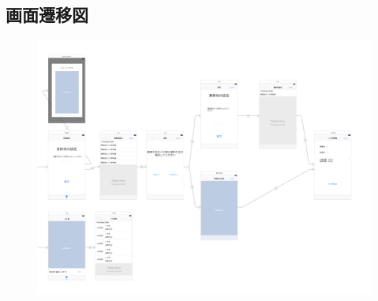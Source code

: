 \documentclass[openany,11pt,papersize]{jsbook}
\begin{document}
  \begin{appendix}

\chapter{画面遷移図}
\begin{figure}[htbp]
  \begin{center}
    \includegraphics[clip,width=19cm,angle=90]{img/picture.png}
    \label{fig:senni}
  \end{center}
\end{figure}


\end{appendix}
\end{document}
